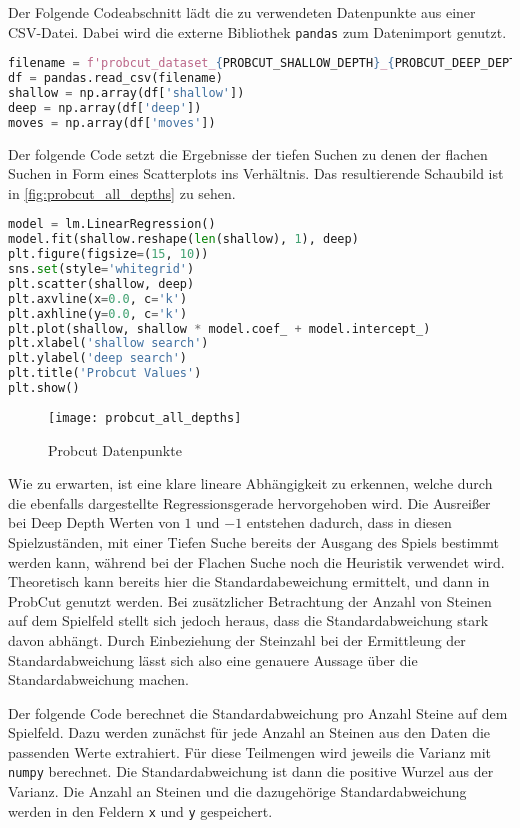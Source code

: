 Der Folgende Codeabschnitt lädt die zu verwendeten Datenpunkte aus einer
CSV-Datei. Dabei wird die externe Bibliothek
\passthrough{\lstinline!pandas!} zum Datenimport genutzt.

\begin{lstlisting}[language=Python]
filename = f'probcut_dataset_{PROBCUT_SHALLOW_DEPTH}_{PROBCUT_DEEP_DEPTH}.csv'
df = pandas.read_csv(filename)
shallow = np.array(df['shallow'])
deep = np.array(df['deep'])
moves = np.array(df['moves'])
\end{lstlisting}

Der folgende Code setzt die Ergebnisse der tiefen Suchen zu denen der
flachen Suchen in Form eines Scatterplots ins Verhältnis. Das
resultierende Schaubild ist in \autoref{fig:probcut_all_depths} zu
sehen.

\begin{lstlisting}[language=Python]
model = lm.LinearRegression()
model.fit(shallow.reshape(len(shallow), 1), deep)
plt.figure(figsize=(15, 10))
sns.set(style='whitegrid')
plt.scatter(shallow, deep)
plt.axvline(x=0.0, c='k')
plt.axhline(y=0.0, c='k')
plt.plot(shallow, shallow * model.coef_ + model.intercept_)
plt.xlabel('shallow search')
plt.ylabel('deep search')
plt.title('Probcut Values')
plt.show()
\end{lstlisting}

\begin{figure}[H]
    \centering
    \texttt{[image: probcut\_all\_depths]}
    \caption{Probcut Datenpunkte}
    \label{fig:probcut_all_depths}
\end{figure}

Wie zu erwarten, ist eine klare lineare Abhängigkeit zu erkennen, welche
durch die ebenfalls dargestellte Regressionsgerade hervorgehoben wird.
Die Ausreißer bei Deep Depth Werten von \(1\) und \(-1\) entstehen
dadurch, dass in diesen Spielzuständen, mit einer Tiefen Suche bereits
der Ausgang des Spiels bestimmt werden kann, während bei der Flachen
Suche noch die Heuristik verwendet wird. Theoretisch kann bereits hier
die Standardabeweichung ermittelt, und dann in ProbCut genutzt werden.
Bei zusätzlicher Betrachtung der Anzahl von Steinen auf dem Spielfeld
stellt sich jedoch heraus, dass die Standardabweichung stark davon
abhängt. Durch Einbeziehung der Steinzahl bei der Ermittleung der
Standardabweichung lässt sich also eine genauere Aussage über die
Standardabweichung machen.

Der folgende Code berechnet die Standardabweichung pro Anzahl Steine auf
dem Spielfeld. Dazu werden zunächst für jede Anzahl an Steinen aus den
Daten die passenden Werte extrahiert. Für diese Teilmengen wird jeweils
die Varianz mit \passthrough{\lstinline!numpy!} berechnet. Die
Standardabweichung ist dann die positive Wurzel aus der Varianz. Die
Anzahl an Steinen und die dazugehörige Standardabweichung werden in den
Feldern \passthrough{\lstinline!x!} und \passthrough{\lstinline!y!}
gespeichert.

